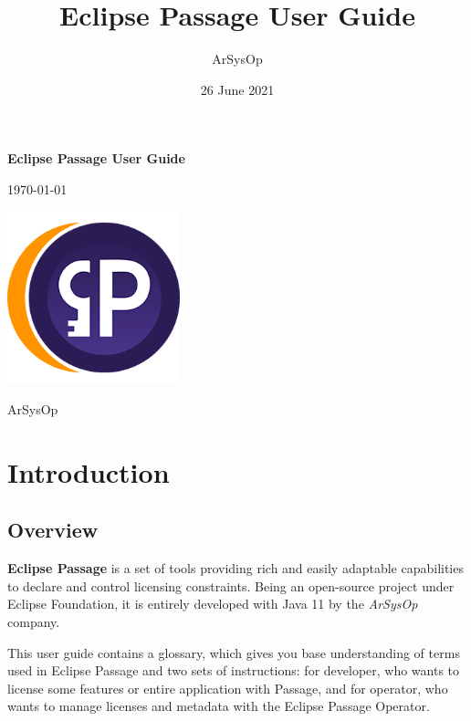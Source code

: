 \documentclass[12pt]{report}
\title{Eclipse Passage User Guide}
\author{ArSysOp}
\date{26 June 2021}
\begin{document}
\begin{titlepage}
    \begin{center}
        \vspace*{1cm}

        \Huge
        \textbf{Eclipse Passage User Guide}

        \vspace{0.5cm}

        \Large
        \today

        \vfill

        \includegraphics[width=5cm]{passage}

        \vfill

        \Large
        ArSysOp
    \end{center}
\end{titlepage}

\tableofcontents
{}

\chapter*{Introduction}

\section*{Overview}

\textbf{Eclipse Passage} is a set of tools providing rich and easily adaptable capabilities to declare and control licensing constraints.
Being an open-source project under Eclipse Foundation, it is entirely developed with Java 11 by the \textit{ArSysOp} company.

This user guide contains a glossary, which gives you base understanding of terms used in Eclipse Passage and two sets of instructions: for developer, who
wants to license some features or entire application with Passage, and for operator, who wants to manage licenses and metadata with the Eclipse Passage Operator.
\end{document}
